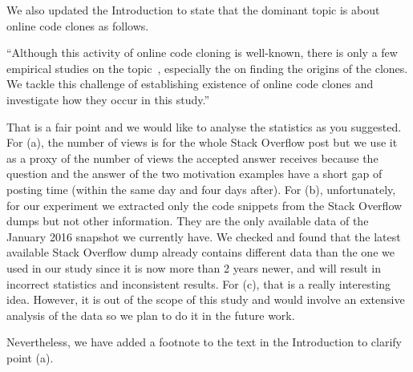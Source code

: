\documentclass[a4paper,twoside,10pt]{reviewresponse}
\begin{document}
We also updated the Introduction to state that the dominant topic is about online code clones as follows.

``Although this activity of online code cloning is well-known, there is only a few
empirical studies on the topic~\citep{An2017,Abdalkareem2017,Baltes2017}, especially
the on finding the origins of the clones.
We tackle this challenge of establishing existence of online code clones and
investigate how they occur in this study.''


That is a fair point and we would like to analyse the statistics as you suggested. 
For (a), the number of views
is for the whole Stack Overflow post but we use it as a proxy of the number of views the accepted answer receives
because the question and the answer of the two motivation examples have a short gap of posting time (within the same day and four days after).
For (b), unfortunately, for our experiment we extracted only the code snippets from the Stack Overflow dumps but not other information. They are the only available data of the January 2016 snapshot we currently have. We checked and found that the latest available Stack Overflow dump already contains different data than the one we used in our study since it is now more than 2 years newer, and will result in incorrect statistics and inconsistent results.
For (c), that is a really interesting idea. However, it is out of the scope of this study and would involve an extensive analysis of the data so we plan to do it in the future work.

 Nevertheless, we have added a footnote to the text in the Introduction to clarify point (a).

\end{document}
